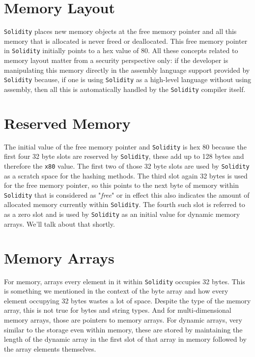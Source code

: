 \section{Memory Layout}
\verb|Solidity| places new memory objects at the free memory pointer and all this memory that is allocated is never freed or deallocated. This free memory pointer in \verb|Solidity| initially points to a hex value of 80. All these concepts related to memory layout matter from a security perspective only: if the developer is manipulating this memory directly in the assembly language support provided by \verb|Solidity| because, if one is using \verb|Solidity| as a high-level language without using assembly, then all this is automatically handled by the \verb|Solidity| compiler itself.

\section{Reserved Memory}
The initial value of the free memory pointer and \verb|Solidity| is hex 80 because the first four 32 byte slots are reserved by \verb|Solidity|, these add up to 128 bytes and therefore the \verb|x80| value. The first two of those 32 byte slots are used by \verb|Solidity| as a scratch space for the hashing methods. The third slot again 32 bytes is used for the free memory pointer, so this points to the next byte of memory within \verb|Solidity| that is considered as "\textit{free}" or in effect this also indicates the amount of allocated memory currently within \verb|Solidity|. The fourth such slot is referred to as a zero slot and is used by \verb|Solidity| as an initial value for dynamic memory arrays. We'll talk about that shortly.

\section{Memory Arrays}
For memory, arrays every element in it within \verb|Solidity| occupies 32 bytes. This is something we mentioned in the context of the byte array and how every element occupying 32 bytes wastes a lot of space. Despite the type of the memory array, this is not true for bytes and string types. And for multi-dimensional memory arrays, those are pointers to memory arrays. For dynamic arrays, very similar to the storage even within memory, these are stored by maintaining the length of the dynamic array in the first slot of that array in memory followed by the array elements themselves.


